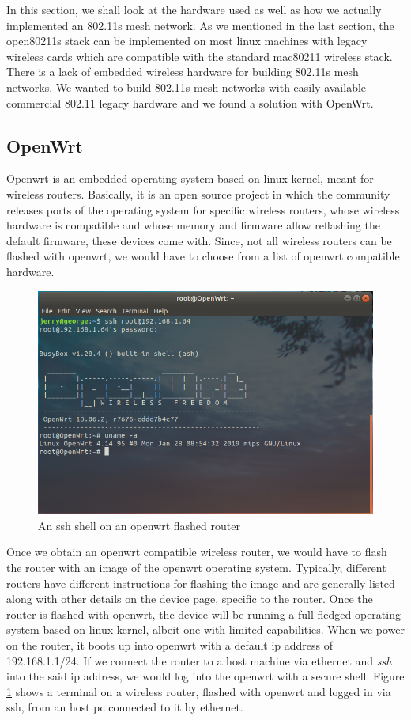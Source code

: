 In this section, we shall look at the hardware used as well as how we actually implemented an 802.11s mesh network. As we mentioned in the last section, the open80211s stack can be implemented on most linux machines with legacy wireless cards which are compatible with the standard mac80211 wireless stack. There is a lack of embedded wireless hardware for building 802.11s mesh networks. We wanted to build 802.11s mesh networks with easily available commercial 802.11 legacy hardware and we found a solution with OpenWrt.

\subsection{OpenWrt}
Openwrt \cite{openwrt} is an embedded operating system based on linux kernel, meant for wireless routers. Basically, it is an open source project in which the community releases ports of the operating system for specific wireless routers, whose wireless hardware is compatible and whose memory and firmware allow reflashing the default firmware, these devices come with. Since, not all wireless routers can be flashed with openwrt, we would have to choose from a list of openwrt compatible hardware.

\begin{figure}[h]
	\centering
	\includegraphics[scale=0.6]{Pictures/ssh4.png}
	\caption{An ssh shell on an openwrt flashed router}
	\label{fig: openwrt-shell}
\end{figure}

Once we obtain an openwrt compatible wireless router, we would have to flash the router with an image of the openwrt operating system. Typically, different routers have different instructions for flashing the image and are generally listed along with other details on the device page, specific to the router. Once the router is flashed with openwrt, the device will be running a full-fledged operating system based on linux kernel, albeit one with limited capabilities. When we power on the router, it boots up into openwrt with a default ip address of 192.168.1.1/24. If we connect the router to a host machine via ethernet and \textit{ssh} into the said ip address, we would log into the openwrt with a secure shell. Figure \ref{fig: openwrt-shell} shows a terminal on a wireless router, flashed with openwrt and logged in via ssh, from an host pc connected to it by ethernet.

